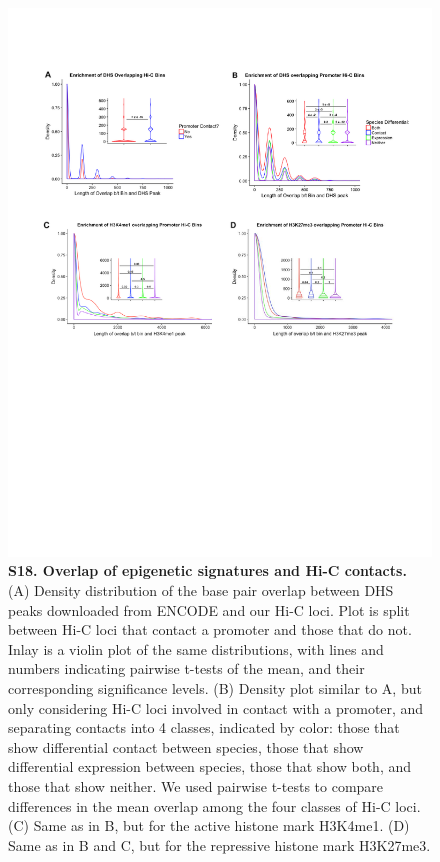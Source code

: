 \begin{figure}[!htb]
\centering
\includegraphics[width=6in]{img/figS18.pdf}
\caption[Overlap of epigenetic signatures and Hi-C contacts.]{\textbf{S18. Overlap of epigenetic signatures and Hi-C contacts.} (A) Density distribution of the base pair overlap between DHS peaks downloaded from ENCODE and our Hi-C loci. Plot is split between Hi-C loci that contact a promoter and those that do not. Inlay is a violin plot of the same distributions, with lines and numbers indicating pairwise t-tests of the mean, and their corresponding significance levels. (B) Density plot similar to A, but only considering Hi-C loci involved in contact with a promoter, and separating contacts into 4 classes, indicated by color: those that show differential contact between species, those that show differential expression between species, those that show both, and those that show neither. We used pairwise t-tests to compare differences in the mean overlap among the four classes of Hi-C loci. (C) Same as in B, but for the active histone mark H3K4me1. (D) Same as in B and C, but for the repressive histone mark H3K27me3.}
\label{fig:ch02-figS18}
\end{figure}

